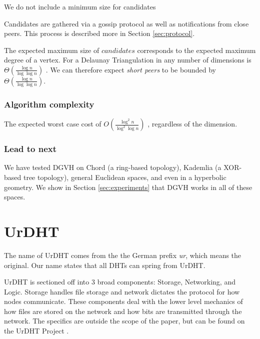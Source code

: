 \documentclass[11pt,conference]{IEEEtran}
\begin{document}
We do not include a minimum size for candidates

Candidates are gathered via a gossip protocol as well as notifications from close peers.
This process is described more in Section \ref{sec:protocol}.


The expected maximum size of $ candidates $ corresponds to the expected maximum degree of a vertex.
For a Delaunay Triangulation in any number of dimensions is $\Theta(\frac{\log n}{\log \log n} )$ \cite{bern1991expected}. 
We can therefore expect \textit{short peers} to be bounded by $\Theta(\frac{\log n}{\log \log n} )$.

\subsubsection*{Algorithm complexity}
The expected worst case cost of \(O(\frac{\log^{2} n}{\log^{2} \log n} )\) \cite{dgvh}, regardless of the dimension.



\subsubsection*{Lead to next}
We have tested DGVH on Chord (a ring-based topology), Kademlia (a XOR-based tree topology), general Euclidean spaces, and even in a hyperbolic geometry.
We show in Section \ref{sec:experiments} that DGVH works in all of these spaces.



\section{UrDHT}
\label{sec:urdht}


The name of UrDHT comes from the the German prefix \textit{ur}, which means the original. 
Our name states that all DHTs can spring from UrDHT.

UrDHT is sectioned off into 3 broad components: Storage, Networking, and Logic.
Storage handles file storage and network dictates the protocol for how nodes communicate.
These components deal with the lower level mechanics of how files are stored on the network and how bits are transmitted through the network.
The specifics are outside the scope of the paper, but can be found on the UrDHT Project \cite{urdht}.
\end{document}
